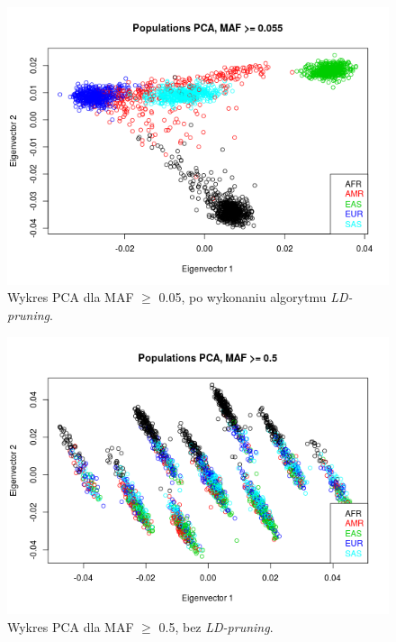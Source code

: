 \documentclass[a4paper]{article}
\begin{document}
\begin{figure}
\centering \includegraphics[width=13cm]{pca-ld.png}
\caption{Wykres PCA dla MAF $\geq$ 0.05, po wykonaniu algorytmu \emph{LD-pruning}. } \label{fig:ld}
\end{figure}

\begin{figure} 
\centering \includegraphics[width=13cm]{pca-maf-0_5-nold.png}
\caption{Wykres PCA dla MAF $\geq$ 0.5, bez \emph{LD-pruning}. } \label{fig:maf0.5-nold}
\end{figure}
\end{document}
